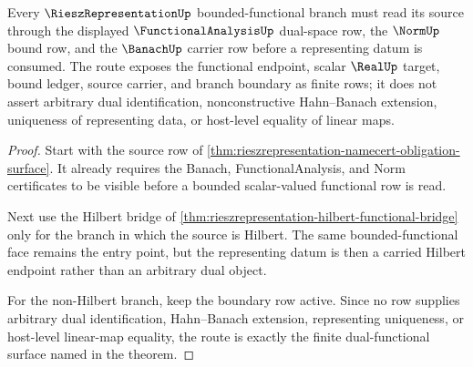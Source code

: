 \begin{theorem}
\label{thm:riesz-representation-dual-functional-route}
Every $\RieszRepresentationUp$ bounded-functional branch must read its source through the displayed $\FunctionalAnalysisUp$ dual-space row, the $\NormUp$ bound row, and the $\BanachUp$ carrier row before a representing datum is consumed. The route exposes the functional endpoint, scalar $\RealUp$ target, bound ledger, source carrier, and branch boundary as finite rows; it does not assert arbitrary dual identification, nonconstructive Hahn--Banach extension, uniqueness of representing data, or host-level equality of linear maps.
\end{theorem}
\begin{proof}
Start with the source row of \autoref{thm:rieszrepresentation-namecert-obligation-surface}. It already requires the Banach, FunctionalAnalysis, and Norm certificates to be visible before a bounded scalar-valued functional row is read.

Next use the Hilbert bridge of \autoref{thm:rieszrepresentation-hilbert-functional-bridge} only for the branch in which the source is Hilbert. The same bounded-functional face remains the entry point, but the representing datum is then a carried Hilbert endpoint rather than an arbitrary dual object.

For the non-Hilbert branch, keep the boundary row active. Since no row supplies arbitrary dual identification, Hahn--Banach extension, representing uniqueness, or host-level linear-map equality, the route is exactly the finite dual-functional surface named in the theorem.
\end{proof}

